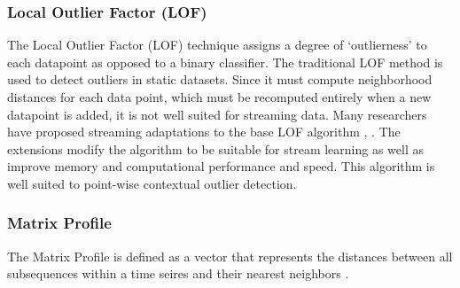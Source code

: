 

\subsubsection{Local Outlier Factor (LOF)}

The Local Outlier Factor (LOF) technique assigns a degree of `outlierness' to each datapoint as opposed to a binary classifier. The traditional LOF method is used to detect outliers in static datasets. Since it must compute neighborhood distances for each data point, which must be recomputed entirely when a new datapoint is added, it is not well suited for streaming data. Many researchers have proposed streaming adaptations to the base LOF algorithm \cite{dilof-data-streams}, \cite{fast-memory-efficent-lof-milof}. The extensions modify the algorithm to be suitable for stream learning as well as improve memory and computational performance and speed. This algorithm is well suited to point-wise contextual outlier detection.

\subsubsection{Matrix Profile} %
\label{ref_matrix-profile-alg}
The Matrix Profile is defined as a vector that represents the distances between all subsequences within a time seires and their nearest neighbors \cite{yeh2016matrix-profile-1}.




